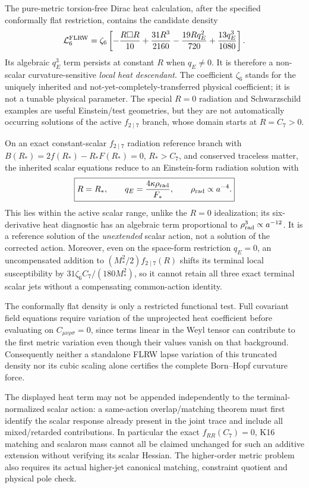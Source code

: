 \documentclass[12pt,a4paper]{article}
\begin{document}
\begin{proposition}
\label{p8:prop:v2166-six-derivative-scope}
The pure-metric torsion-free Dirac heat calculation, after the specified
conformally flat restriction, contains the candidate density
\[
\mathcal L_6^{\rm FLRW}=\zeta_6\left[-\frac{R\Box R}{10}
 +\frac{31R^3}{2160}-\frac{19Rq_E^2}{720}
 +\frac{13q_E^3}{1080}\right].
\]
Its algebraic \(q_E^3\) term persists at constant \(R\) when
\(q_E\ne0\).  It is therefore a non-scalar curvature-sensitive
\emph{local heat descendant}.  The coefficient \(\zeta_6\) stands for
the uniquely inherited and not-yet-completely-transferred physical
coefficient; it is not a tunable physical parameter.  The special
\(R=0\) radiation and Schwarzschild examples are useful Einstein/test
geometries, but they are not automatically occurring solutions of the active
\(f_{2\mid7}\) branch, whose domain starts at \(R=C_7>0\).

On an exact constant-scalar \(f_{2\mid7}\) radiation reference branch
with \(B(R_*)=2f(R_*)-R_*F(R_*)=0\), \(R_*>C_7\), and
conserved traceless matter, the inherited scalar equations reduce to an
Einstein-form radiation solution with
\[
 \boxed{R=R_*,\qquad
 q_E=\frac{4\kappa\rho_{\rm rad}}{F_*},\qquad
 \rho_{\rm rad}\propto a^{-4}.}
\]
This lies within the active scalar range, unlike the \(R=0\) idealization;
its six-derivative heat diagnostic has an algebraic term proportional to
\(\rho_{\rm rad}^3\propto a^{-12}\).  It is a reference solution of the
\emph{unextended} scalar action, not a solution of the corrected action.
Moreover, even on the space-form restriction \(q_E=0\), an uncompensated
addition to \((M_*^2/2)f_{2\mid7}(R)\) shifts its terminal local
susceptibility by \(31\zeta_6 C_7/(180M_*^2)\), so it cannot retain
all three exact terminal scalar jets without a compensating common-action
identity.

The conformally flat density is only a restricted functional test.
Full covariant field equations require variation of the unprojected heat
coefficient before evaluating on \(C_{\mu\nu\rho\sigma}=0\), since terms
linear in the Weyl tensor can contribute to the first metric variation even
though their values vanish on that background.  Consequently neither a
standalone FLRW lapse variation of this truncated density nor its cubic
scaling alone certifies the complete Born--Hopf curvature force.

The displayed heat term may not be appended independently to the
terminal-normalized scalar action: a same-action overlap/matching theorem must
first identify the scalar response already present in the joint trace and
include all mixed/retarded contributions.  In particular the exact
\(f_{RR}(C_7)=0\), K16 matching and scalaron mass cannot all be claimed
unchanged for such an additive extension without verifying its scalar
Hessian.  The higher-order metric problem also requires its actual
higher-jet canonical matching, constraint quotient and physical pole check.
\end{proposition}
\end{document}
